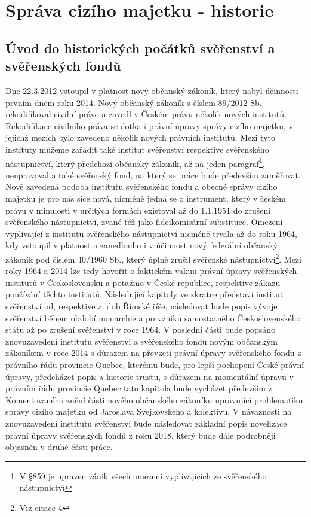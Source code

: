 \documentclass{article}
\begin{document}
\newpage

\section{Správa cizího majetku - historie}

\subsection{Úvod do historických počátků svěřenství a svěřenských fondů}

\indent Dne 22.3.2012 vstoupil v platnost nový občanský zákoník, který nabyl účinnosti prvním dnem roku 2014. Nový občanský zákoník s číslem 89/2012 Sb. rekodifikoval civilní právo a zavedl v Českém právu několik nových institutů. Rekodifikace civilního práva se dotka i právní úpravy správy cizího majetku, v jejichž mezích bylo zavedeno několik nových právních institutů. Mezi tyto instituty můžeme zařadit také institut svěřenství respektive svěřenského nástupnictví, který předchozí občanský zákoník, až na jeden paragraf\footnote{V §859 je upraven zánik všech omezení vyplívajících ze svěřenského nástupnictví}, neupravoval a také svěřenský fond, na který se práce bude především zaměřovat. \\

\indent Nově zavedená podoba institutu svěřenského fondu a obecné správy cizího majetku je pro nás sice nová, nicméně jedná se o instrument, který v českém právu v minulosti v určitých formách existoval až do 1.1.1951 do zrušení svěřens\-kého nástupnictví, zvané též jako fideikomisární substituce. Omezení vyplívající z institutu svěřenského nástupnictví nicméně trvala až do roku 1964, kdy vstoupil v platnost a zanedlouho i v účinnost nový federální občanský zákoník pod číslem 40/1960 Sb., který úplně zrušil svěřenské nástupnictví\footnote{Viz citace 4}. Mezi roky 1964 a 2014 lze tedy hovořit o faktickém vakuu právní úpravy svěřenských institutů v Československu a potažmo v České republice, respektive zákazu používání těchto institutů. Následující kapitoly ve zkratce představí institut svěřenství od, respektive z, dob Římské říše, následovat bude popis vývoje svěřenství během období monarchie a po vzniku samostatného Československého státu až po zrušení svěřenství v roce 1964. V poslední části bude popsáno znovuzavedení institutu svěřenství a svěřenského fondu novým občanským zákoníkem v roce 2014 s důrazem na převzetí právní úpravy svěřenského fondu z právního řádu provincie Quebec, kterému bude, pro lepší pochopení České právní úpravy, předcházet popis a historie trustu, s důrazem na momentální úpravu v právním řádu provincie Quebec tato kapitola bude vycházet především z Komentovaného znění části nového občanského zákoníku upravující problematiku správy cizího majetku od Jaroslava Svejkovského a kolektivu. V návaznosti na znovuzavedení institutu svěřenství bude následovat základní popis novelizace právní úpravy svěřenských fondů z roku 2018, který bude dále podrobněji objasněn v druhé části práce. \\
\end{document}
